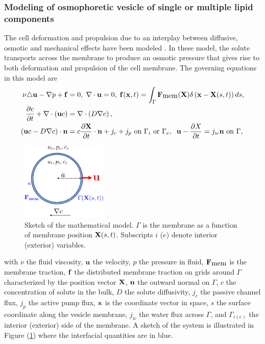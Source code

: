 \documentclass[11pt]{article}
\begin{document}
\subsubsection{Modeling of osmophoretic vesicle of single or multiple lipid components\label{subsubsec:aim1_math}}
The cell deformation and propulsion due to an interplay between diffusive, osmotic and mechanical effects 
 have been modeled \cite{Blount2012_PRE,Vogl2014_JRSInterface,YaoMori2017_JCP}. 
 In these model, the solute transports across the membrane to produce an
 osmotic pressure that gives rise to both deformation and propulsion of the cell membrane. The governing equations in this model are
\begin{align}
\nu \triangle {\bf u} - \nabla p + {\bf f} &=0, \;\nabla\cdot{\bf u} = 0, \; {\bf f}({\bf x},t) = \int_{\Gamma}{\bf F}_{\mbox{mem}}({\bf X})\delta\left({\bf x}-{\bf X}(s,t)\right)ds,\\
\frac{\partial c}{\partial t} + \nabla\cdot\left({\bf u} c\right) &= \nabla\cdot\left(D\nabla c\right),\\
\left({\bf u} c-D\nabla c\right)\cdot{\bf n} &= c\frac{\partial {\bf X}}{\partial t}\cdot{\bf n}+j_c+j_p \mbox{ on } \Gamma_i \mbox{ or } \Gamma_e,\;\;{\bf u} - \frac{\partial X}{\partial t} = j_w {\bf n} \mbox{ on } \Gamma,
\end{align}
\begin{figure}
\vspace*{-10pt}
\centerline{\includegraphics[width=1.6in]{figs/math_model_illustrate.pdf}}
\caption{\footnotesize Sketch of the mathematical model. $\Gamma$ is the membrane as a function of membrane position ${\bf X}(s,t)$. Subscripts $i$ ($e$) denote
interior (exterior) variables.}
\label{fig:math_model_illustration}
\end{figure}
%
with $\nu$ the fluid viscosity,  ${\bf u}$ the velocity, $p$ the pressure in fluid, 
${\bf F}_{\mbox{mem}}$ is the membrane traction,
${\bf f}$ the distributed membrane traction on grids around $\Gamma$ 
characterized by the position vector ${\bf X}$, ${\bf n}$ the outward normal on $\Gamma$,
$c$ the concentration of solute in the bulk, $D$ the solute diffusivity, $j_c$ the passive channel flux, $j_p$ the active pump flux, ${\bf x}$ is the coordinate vector in space, 
$s$ the surface coordinate along the vesicle membrane, $j_w$ the water flux across $\Gamma$,
and $\Gamma_{i(e)}$ the interior (exterior) side of the membrane. 
A sketch of the system is illustrated in Figure (\ref{fig:math_model_illustration}) where the interfacial quantities are in blue.
\end{document}
